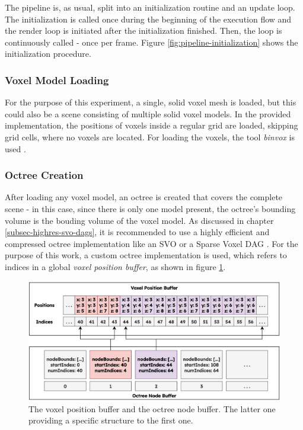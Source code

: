 \noindent
The pipeline is, as usual, split into an initialization routine and an update loop. The initialization is 
called once during the beginning of the execution flow and the render loop is initiated after the initialization 
finished. Then, the loop is continuously called - once per frame. Figure \ref{fig:pipeline-initialization} shows 
the initialization procedure. 

\subsubsection*{Voxel Model Loading} \label{subsec-voxel-model-loading}

For the purpose of this experiment, a single, solid voxel mesh is loaded, but this could also be a scene 
consisting of multiple solid voxel models. In the provided implementation, the positions of voxels inside a regular 
grid are loaded, skipping grid cells, where no voxels are located. For loading the voxels, the tool \emph{binvox} 
is used \cite{binvox, Nooruddin2003}. 


\subsubsection*{Octree Creation} \label{subsec-octree-creation}

After loading any voxel model, an octree is created that covers the complete scene - in this case, since there is 
only one model present, the octree's bounding volume is the bouding volume of the voxel model. As discussed in 
chapter \ref{subsec-highres-svo-dags}, it is recommended to use a highly efficient and compressed octree implementation 
like an \ac{SVO} or a Sparse Voxel \ac{DAG} \cite{Kampe2013}. For the purpose of this work, a custom octree 
implementation is used, which refers to indices in a global \emph{voxel position buffer}, as shown in figure 
\ref{fig:voxelpos-octreenode-buffer}.\\

\begin{figure}[h]
    \centering
    \includegraphics[width=\linewidth]{images/graphics/voxelpos-octreenode-buffer.jpg}
    \caption{The voxel position buffer and the octree node buffer. The latter one providing a 
    specific structure to the first one.}
    \label{fig:voxelpos-octreenode-buffer}
\end{figure}


